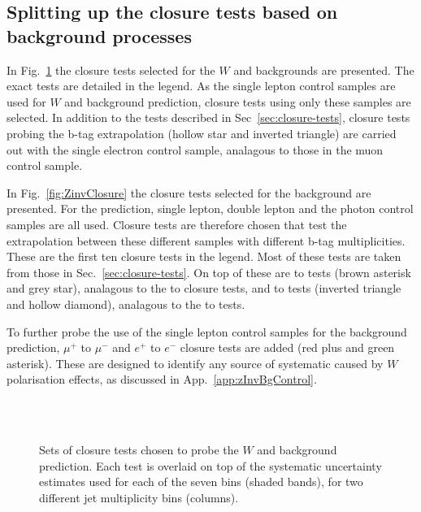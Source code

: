 \subsection{Splitting up the closure tests based on background
processes \label{sec:closure-split}}

In Fig.~\ref{fig:ttWClosure} the closure tests selected for the $W$ and
\ttbar backgrounds are presented. The exact tests are detailed
in the legend. As the single lepton control samples are used for $W$ and
\ttbar background prediction, closure tests using only these samples
are selected. In addition to the tests described in
Sec~\ref{sec:closure-tests}, closure tests probing the b-tag
extrapolation (hollow star and inverted triangle) are carried out with 
the single electron control sample, analagous to those in the muon control sample.

In Fig.~\ref{fig:ZinvClosure} the closure tests selected for the
\znunu background are presented. For the \znunu prediction, single
lepton, double lepton and the photon control samples are all used.
Closure tests are therefore chosen that test the extrapolation
between these different samples with different b-tag multiplicities. 
These are the first ten closure tests in the legend. Most of these
tests are taken from those in Sec.~\ref{sec:closure-tests}. On top
of these are \mmj to \gj tests (brown asterisk and grey star), analagous to
the \eej to \gj closure tests, and \ej to \eej tests (inverted
triangle and hollow diamond), analagous to the \mj to \mmj tests.

To further probe the use of the single lepton control samples for the
\znunu background prediction, $\mu^+$ to $\mu^-$ and $e^+$ to $e^-$
closure tests are added (red plus and green asterisk). These are 
designed to identify any source of systematic caused by $W$ polarisation 
effects, as discussed in App.~\ref{app:zInvBgControl}.

\begin{figure}[h!]
  \begin{center}
     \\
     ~~
     \\
    \caption{Sets of closure tests chosen to probe the $W$ and \ttbar
      background prediction. Each test is overlaid on top of
      the systematic uncertainty estimates used for each of the seven
      \scalht bins (shaded bands), for two different jet
      multiplicity bins (columns).}
    \label{fig:ttWClosure}
  \end{center} 
\end{figure}

